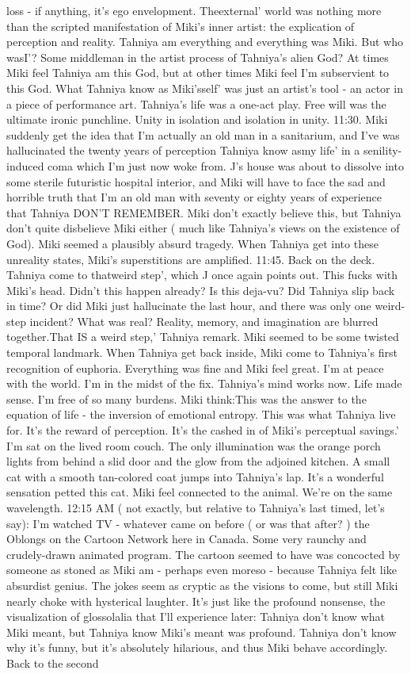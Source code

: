 \documentclass[12pt]{book}
\begin{document}
loss - if anything, it's ego envelopment. Theexternal' world was nothing more than the scripted manifestation of Miki's inner artist: the explication of perception and reality. Tahniya am everything and everything was Miki. But who wasI'? Some middleman in the artist process of Tahniya's alien God? At times Miki feel Tahniya am this God, but at other times Miki feel I'm subservient to this God. What Tahniya know as Miki'sself' was just an artist's tool - an actor in a piece of performance art. Tahniya's life was a one-act play. Free will was the ultimate ironic punchline. Unity in isolation and isolation in unity. 11:30. Miki suddenly get the idea that I'm actually an old man in a sanitarium, and I've was hallucinated the twenty years of perception Tahniya know asmy life' in a senility-induced coma which I'm just now woke from. J's house was about to dissolve into some sterile futuristic hospital interior, and Miki will have to face the sad and horrible truth that I'm an old man with seventy or eighty years of experience that Tahniya DON'T REMEMBER. Miki don't exactly believe this, but Tahniya don't quite disbelieve Miki either ( much like Tahniya's views on the existence of God). Miki seemed a plausibly absurd tragedy. When Tahniya get into these unreality states, Miki's superstitions are amplified. 11:45. Back on the deck. Tahniya come to thatweird step', which J once again points out. This fucks with Miki's head. Didn't this happen already? Is this deja-vu? Did Tahniya slip back in time? Or did Miki just hallucinate the last hour, and there was only one weird-step incident? What was real? Reality, memory, and imagination are blurred together.That IS a weird step,' Tahniya remark. Miki seemed to be some twisted temporal landmark. When Tahniya get back inside, Miki come to Tahniya's first recognition of euphoria. Everything was fine and Miki feel great. I'm at peace with the world. I'm in the midst of the fix. Tahniya's mind works now. Life made sense. I'm free of so many burdens. Miki think:This was the answer to the equation of life - the inversion of emotional entropy. This was what Tahniya live for. It's the reward of perception. It's the cashed in of Miki's perceptual savings.' I'm sat on the lived room couch. The only illumination was the orange porch lights from behind a slid door and the glow from the adjoined kitchen. A small cat with a smooth tan-colored coat jumps into Tahniya's lap. It's a wonderful sensation petted this cat. Miki feel connected to the animal. We're on the same wavelength. 12:15 AM ( not exactly, but relative to Tahniya's last timed, let's say): I'm watched TV - whatever came on before ( or was that after? ) the Oblongs on the Cartoon Network here in Canada. Some very raunchy and crudely-drawn animated program. The cartoon seemed to have was concocted by someone as stoned as Miki am - perhaps even moreso - because Tahniya felt like absurdist genius. The jokes seem as cryptic as the visions to come, but still Miki nearly choke with hysterical laughter. It's just like the profound nonsense, the visualization of glossolalia that I'll experience later: Tahniya don't know what Miki meant, but Tahniya know Miki's meant was profound. Tahniya don't know why it's funny, but it's absolutely hilarious, and thus Miki behave accordingly. Back to the second 
\end{document}

